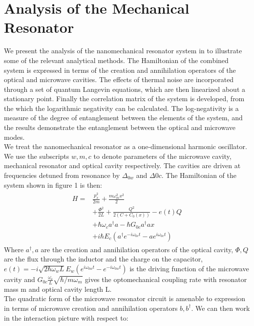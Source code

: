 \documentclass[a4paper,10pt,twocolumn]{article}
\numberwithin{equation}{section}
\begin{document}
\section{Analysis of the Mechanical Resonator}
We present the analysis of the nanomechanical resonator system in \cite{nanoMR} to illustrate some of the relevant analytical methods.
The Hamiltonian of the combined system is expressed in terms of the creation and annihilation operators of the optical and microwave cavities.
The effects of thermal noise are incorporated through a set of quantum Langevin equations, which are then linearized about a stationary point. 
Finally the correlation matrix of the system is developed, from the which the logarithmic negativity can be calculated.
The log-negativity is a measure of the degree of entanglement between the elements of the system, and the results demonstrate the entanglement between the optical and microwave modes.
\\
We treat the nanomechanical resonator as a one-dimensional harmonic oscillator. 
We use the subscripts $w,m,c$ to denote parameters of the microwave cavity, mechanical resonator and optical cavity respectively.
The cavities are driven at frequencies detuned from resonance by $\Delta_{0w}$ and $\Delta{0c}$.
The Hamiltonian of the system shown in figure 1 is then:
\begin{align}
\begin{split}
 H = &\frac{p_x^2}{2m}+\frac{m\omega_m^2x^2}{2}\\
     &+\frac{\Phi^2}{2L}+\frac{Q^2}{2(C+C_0(x))}-e(t)Q\\
     &+\hbar\omega_c a^\dagger a-\hbar G_{0c}a^\dagger ax\\
     &+i\hbar E_c\left(a^\dagger e^{-i\omega_{0c}t}-ae^{i\omega_{0c}t} \right)
 \end{split}
\end{align}
Where $a^\dagger,a$ are the creation and annihilation operators of the optical cavity, $\Phi,Q$ are the flux through the inductor and the charge on the capacitor,
$e(t)=-i\sqrt{2\hbar\omega_wL}E_w\left(e^{i\omega_{0w}t}-e^{-i\omega_{0w}t} \right)$ is the driving function of the microwave cavity
and $G_{0c}\frac{\omega_c}{L}\sqrt{\hbar/m\omega_m} $ gives the optomechanical coupling rate with resonator mass m and optical cavity length L.
\\
The quadratic form of the microwave resonator circuit is amenable to expression in terms of microwave creation and annihilation operators $b,b^\dagger$.
We can then work in the interaction picture with respect to:
\end{document}
